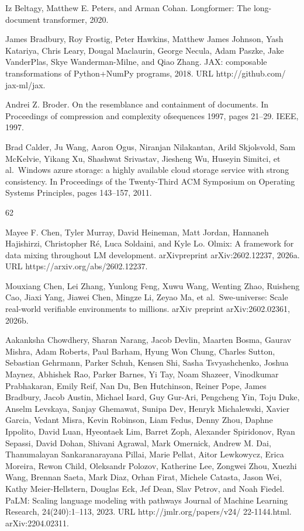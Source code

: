 \documentclass[
  10
]{article}
\begin{document}
Iz Beltagy, Matthew E. Peters, and Arman Cohan. Longformer: The
long-document transformer, 2020.

James Bradbury, Roy Frostig, Peter Hawkins, Matthew James Johnson, Yash
Katariya, Chris Leary, Dougal Maclaurin, George Necula, Adam Paszke,
Jake VanderPlas, Skye Wanderman-Milne, and Qiao Zhang. JAX: composable
transformations of Python+NumPy programs, 2018. URL http://github.com/
jax-ml/jax.

Andrei Z. Broder. On the resemblance and containment of documents. In
Proceedings of compression and complexity ofsequences 1997, pages
21--29. IEEE, 1997.

Brad Calder, Ju Wang, Aaron Ogus, Niranjan Nilakantan, Arild Skjolsvold,
Sam McKelvie, Yikang Xu, Shashwat Srivastav, Jiesheng Wu, Huseyin
Simitci, et al.~Windows azure storage: a highly available cloud storage
service with strong consistency. In Proceedings of the Twenty-Third ACM
Symposium on Operating Systems Principles, pages 143--157, 2011.

62

Mayee F. Chen, Tyler Murray, David Heineman, Matt Jordan, Hannaneh
Hajishirzi, Christopher Ré, Luca Soldaini, and Kyle Lo. Olmix: A
framework for data mixing throughout LM development. arXivpreprint
arXiv:2602.12237, 2026a. URL https://arxiv.org/abs/2602.12237.

Mouxiang Chen, Lei Zhang, Yunlong Feng, Xuwu Wang, Wenting Zhao,
Ruisheng Cao, Jiaxi Yang, Jiawei Chen, Mingze Li, Zeyao Ma, et
al.~Swe-universe: Scale real-world verifiable environments to millions.
arXiv preprint arXiv:2602.02361, 2026b.

Aakanksha Chowdhery, Sharan Narang, Jacob Devlin, Maarten Bosma, Gaurav
Mishra, Adam Roberts, Paul Barham, Hyung Won Chung, Charles Sutton,
Sebastian Gehrmann, Parker Schuh, Kensen Shi, Sasha Tsvyashchenko,
Joshua Maynez, Abhishek Rao, Parker Barnes, Yi Tay, Noam Shazeer,
Vinodkumar Prabhakaran, Emily Reif, Nan Du, Ben Hutchinson, Reiner Pope,
James Bradbury, Jacob Austin, Michael Isard, Guy Gur-Ari, Pengcheng Yin,
Toju Duke, Anselm Levskaya, Sanjay Ghemawat, Sunipa Dev, Henryk
Michalewski, Xavier Garcia, Vedant Misra, Kevin Robinson, Liam Fedus,
Denny Zhou, Daphne Ippolito, David Luan, Hyeontaek Lim, Barret Zoph,
Alexander Spiridonov, Ryan Sepassi, David Dohan, Shivani Agrawal, Mark
Omernick, Andrew M. Dai, Thanumalayan Sankaranarayana Pillai, Marie
Pellat, Aitor Lewkowycz, Erica Moreira, Rewon Child, Oleksandr Polozov,
Katherine Lee, Zongwei Zhou, Xuezhi Wang, Brennan Saeta, Mark Diaz,
Orhan Firat, Michele Catasta, Jason Wei, Kathy Meier-Hellstern, Douglas
Eck, Jef Dean, Slav Petrov, and Noah Fiedel. PaLM: Scaling language
modeling with pathways Journal of Machine Learning Research,
24(240):1--113, 2023. URL http://jmlr.org/papers/v24/ 22-1144.html.
arXiv:2204.02311.
\end{document}

